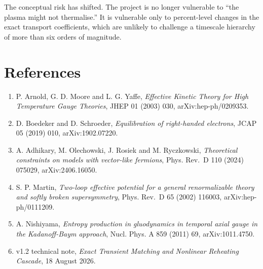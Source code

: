 \documentclass[
  10pt,
]{article}
\providecommand{\tightlist}{%
  \setlength{\itemsep}{0pt}\setlength{\parskip}{0pt}}
\begin{document}
The conceptual risk has shifted. The project is no longer vulnerable to
``the plasma might not thermalise.'' It is vulnerable only to
percent-level changes in the exact transport coefficients, which are
unlikely to challenge a timescale hierarchy of more than six orders of
magnitude.

\section{References}\label{references}

\begin{enumerate}
\def\labelenumi{\arabic{enumi}.}
\tightlist
\item
  P. Arnold, G. D. Moore and L. G. Yaffe, \emph{Effective Kinetic Theory
  for High Temperature Gauge Theories}, JHEP 01 (2003) 030,
  arXiv:hep-ph/0209353.
\item
  D. Boedeker and D. Schroeder, \emph{Equilibration of right-handed
  electrons}, JCAP 05 (2019) 010, arXiv:1902.07220.
\item
  A. Adhikary, M. Olechowski, J. Rosiek and M. Ryczkowski,
  \emph{Theoretical constraints on models with vector-like fermions},
  Phys. Rev.~D 110 (2024) 075029, arXiv:2406.16050.
\item
  S. P. Martin, \emph{Two-loop effective potential for a general
  renormalizable theory and softly broken supersymmetry}, Phys. Rev.~D
  65 (2002) 116003, arXiv:hep-ph/0111209.
\item
  A. Nishiyama, \emph{Entropy production in gluodynamics in temporal
  axial gauge in the Kadanoff-Baym approach}, Nucl. Phys. A 859 (2011)
  69, arXiv:1011.4750.
\item
  v1.2 technical note, \emph{Exact Transient Matching and Nonlinear
  Reheating Cascade}, 18 August 2026.
\end{enumerate}
\end{document}
